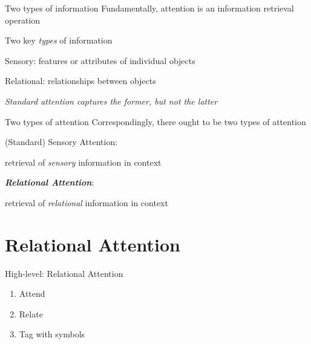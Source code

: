 \documentclass[xcolor={dvipsnames}]{beamer}
\begin{document}
\begin{frame}{Two types of information}
    Fundamentally, attention is an information retrieval operation

    Two key \textit{types} of information

    \quad \alert{Sensory}: features or attributes of individual objects

    \quad \alert{Relational}: relationships between objects

    \emph{Standard attention captures the former, but not the latter}
\end{frame}

\begin{frame}{Two types of attention}
    Correspondingly, there ought to be two types of attention

    \alert{(Standard) Sensory Attention}:

    \quad retrieval of \emph{sensory} information in context

    \alert{\textbf{\emph{Relational Attention}}}:

    \quad retrieval of \emph{relational} information in context
\end{frame}



\section{Relational Attention}
\begin{frame}{High-level: Relational Attention}
    \Large{
    \begin{enumerate}
        \item Attend
        \item Relate
        \item Tag with symbols
    \end{enumerate}
    }
\end{frame}
\end{document}

